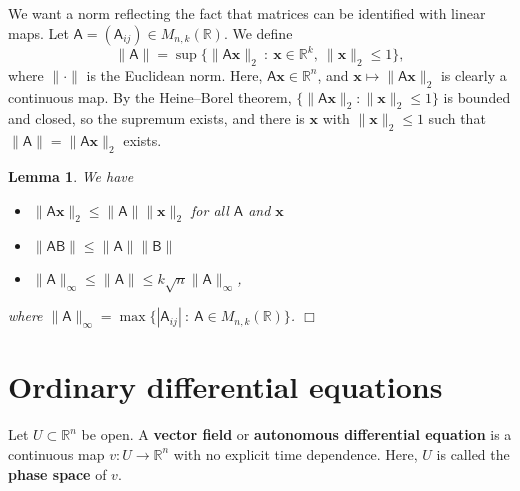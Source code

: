 \documentclass[letter-paper]{tufte-book}
\newtheorem{lemma}[theorem]{\color{pastel-blue}Lemma}
\newcommand{\qedwhite}{\hfill \ensuremath{\Box}}
\begin{document}
We want a norm reflecting the fact that matrices can be identified with linear
maps. Let $\boldsymbol{\mathsf{A}} = (\mathsf{A}_{ij}) \in M_{n,k}(\mathbb{R})$.
We define
\begin{equation}
  \| \boldsymbol{\mathsf{A}} \| = \sup \{ \|\boldsymbol{\mathsf{A}}\boldsymbol{x}\|_2 \ : \ \boldsymbol{x} \in \mathbb{R}^k,\ \|\boldsymbol{x}\|_2 \leq 1\},
\end{equation}
where $\|\cdot\|$ is the Euclidean norm. Here,
$\boldsymbol{\mathsf{A}}\boldsymbol{x} \in \mathbb{R}^n$, and $\boldsymbol{x}
\mapsto \|\boldsymbol{\mathsf{A}}\boldsymbol{x}\|_2$ is clearly a continuous
map. By the Heine--Borel theorem, $\{
\|\boldsymbol{\mathsf{A}}\boldsymbol{x}\|_2 : \|\boldsymbol{x}\|_2 \leq 1\}$ is
bounded and closed, so the supremum exists, and there is $\boldsymbol{x}$ with
$\|\boldsymbol{x}\|_2 \leq 1$ such that $\| \boldsymbol{\mathsf{A}} \| =
\|\boldsymbol{\mathsf{A}}\boldsymbol{x}\|_2$ exists.

\begin{lemma}
  We have
  \begin{itemize}
    \item $\|\boldsymbol{\mathsf{A}}\boldsymbol{x}\|_2 \leq
    \|\boldsymbol{\mathsf{A}}\| \|\boldsymbol{x}\|_2$ for all
    $\boldsymbol{\mathsf{A}}$ and $\boldsymbol{x}$

    \item $\|\boldsymbol{\mathsf{A}}\boldsymbol{\mathsf{B}}\| \leq
    \|\boldsymbol{\mathsf{A}}\| \|\boldsymbol{\mathsf{B}}\|$
    
    \item $\|\boldsymbol{\mathsf{A}}\|_\infty \leq \|\boldsymbol{\mathsf{A}}\|
    \leq k\sqrt{n} \|\boldsymbol{\mathsf{A}}\|_\infty$,
  \end{itemize}
  where $\|\boldsymbol{\mathsf{A}}\|_\infty = \max \{ |\mathsf{A}_{ij}|\ : \
  \boldsymbol{\mathsf{A}} \in M_{n,k}(\mathbb{R})\}$. \qedwhite
\end{lemma}


\chapter{Ordinary differential equations}

Let $U \subset \mathbb{R}^n$ be open. A \textbf{vector field} or
\textbf{autonomous differential equation} is a continuous map $v : U \to
\mathbb{R}^n$ with no explicit time dependence. Here, $U$ is called the
\textbf{phase space} of $v$.
\end{document}

